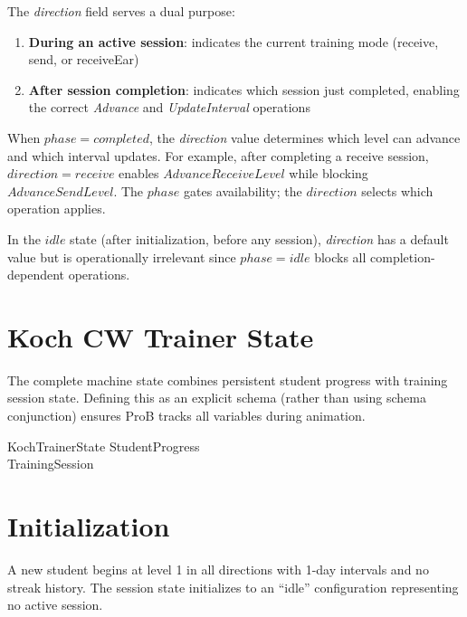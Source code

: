 \documentclass[a4paper,10pt,fleqn]{article}
\begin{document}
The \emph{direction} field serves a dual purpose:
\begin{enumerate}
\item \textbf{During an active session}: indicates the current training mode
      (receive, send, or receiveEar)
\item \textbf{After session completion}: indicates which session just completed,
      enabling the correct \emph{Advance} and \emph{UpdateInterval} operations
\end{enumerate}

When $phase = completed$, the \emph{direction} value determines which level can
advance and which interval updates. For example, after completing a receive
session, $direction = receive$ enables $AdvanceReceiveLevel$ while blocking
$AdvanceSendLevel$. The $phase$ gates availability; the $direction$ selects
which operation applies.

In the $idle$ state (after initialization, before any session), \emph{direction}
has a default value but is operationally irrelevant since $phase = idle$ blocks
all completion-dependent operations.

\section{Koch CW Trainer State}

The complete machine state combines persistent student progress with training
session state. Defining this as an explicit schema (rather than using schema
conjunction) ensures ProB tracks all variables during animation.

\begin{schema}{KochTrainerState}
StudentProgress \\
TrainingSession
\end{schema}

\section{Initialization}

A new student begins at level 1 in all directions with 1-day intervals and
no streak history. The session state initializes to an ``idle'' configuration
representing no active session.
\end{document}
